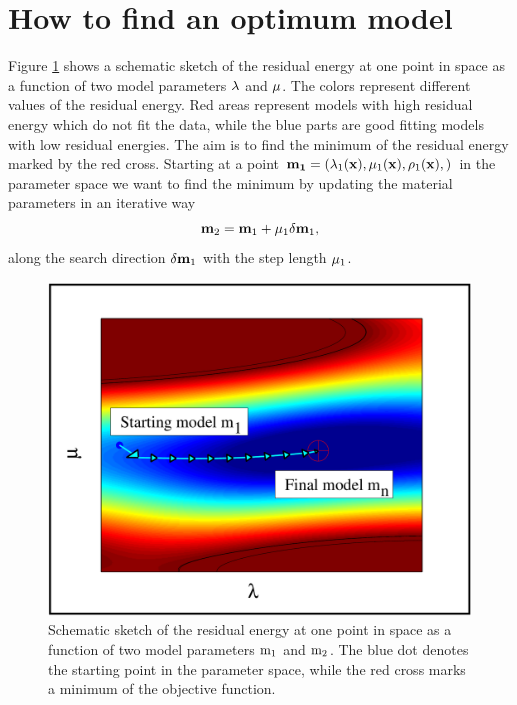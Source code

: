 \section{How to find an optimum model}
Figure \ref{sketch_grad} shows a schematic sketch of the residual energy at one point in space as a function of two model parameters 
$\rm{\lambda}$ and $\rm{\mu}$. The colors represent different values of the residual energy. Red areas represent models with high residual 
energy which do not fit the data, while the blue parts are good fitting models with low residual energies. The aim is to find the minimum of 
the residual energy marked by the red cross. Starting at a point $\rm{\mathbf{m_1} = (\lambda_1 (\mathbf{x}), \mu_1 (\mathbf{x}), \rho_1 (\mathbf{x}),)}$ in the parameter space we want to find the minimum by updating the material parameters in an iterative way
\begin{equation} 
\rm{\mathbf{m}_{2} = \mathbf{m}_{1} + \mu_1 \mathbf{\delta m}_{1}, }
\label{eq_update}
\end{equation}
along the search direction $\rm{\mathbf{\delta m}_{1}}$ with the step length $\rm{\mu_1}$. 
\begin{figure}[!bh]
\begin{center}
\includegraphics[width=12.5cm]{figures/sketch_grad_1.pdf}
\caption{Schematic sketch of the residual energy at one point in space as a function of two model parameters $\rm{m_1}$ and $\rm{m_2}$. The blue dot denotes the starting point in the parameter space, while the red cross marks a minimum of the objective function.}
\label{sketch_grad}
\end{center}
\end{figure} 
